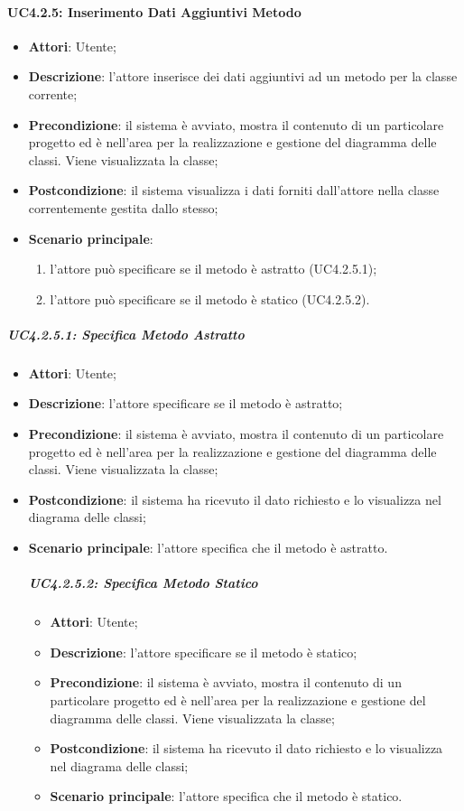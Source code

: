 \begin{itemize}
\begin{itemize}
\paragraph{UC4.2.5: Inserimento Dati Aggiuntivi Metodo}
\label{UC4.2.5}
\begin{itemize}
	\item \textbf{Attori}: Utente;
	\item \textbf{Descrizione}: l'attore inserisce dei dati aggiuntivi ad un metodo per la classe corrente;
	\item \textbf{Precondizione}:  il sistema è avviato, mostra il contenuto di un particolare progetto ed è nell'area per la realizzazione e gestione del diagramma delle classi. Viene visualizzata la classe;
	\item \textbf{Postcondizione}: il sistema visualizza i dati forniti dall'attore nella classe correntemente gestita dallo stesso;
	\item \textbf{Scenario principale}:
	\begin{enumerate}
		\item l'attore può specificare se il metodo è astratto (UC4.2.5.1);
		\item l'attore può specificare se il metodo è statico (UC4.2.5.2).
	\end{enumerate}
\end{itemize}

\subparagraph{UC4.2.5.1: Specifica Metodo Astratto}
\label{UC4.2.5.1}
\begin{itemize}
	\item \textbf{Attori}: Utente;
	\item \textbf{Descrizione}: l'attore specificare se il metodo è astratto;
	\item \textbf{Precondizione}: il sistema è avviato, mostra il contenuto di un particolare progetto ed è nell'area per la realizzazione e gestione del diagramma delle classi. Viene visualizzata la classe;
	\item \textbf{Postcondizione}: il sistema ha ricevuto il dato richiesto e lo visualizza nel diagrama delle classi;
	\item \textbf{Scenario principale}: l'attore specifica che il metodo è astratto.

\subparagraph{UC4.2.5.2: Specifica Metodo Statico}
\label{UC4.2.5.2}
\begin{itemize}
	\item \textbf{Attori}: Utente;
	\item \textbf{Descrizione}: l'attore specificare se il metodo è statico;
	\item \textbf{Precondizione}: il sistema è avviato, mostra il contenuto di un particolare progetto ed è nell'area per la realizzazione e gestione del diagramma delle classi. Viene visualizzata la classe;
	\item \textbf{Postcondizione}: il sistema ha ricevuto il dato richiesto e lo visualizza nel diagrama delle classi;
	\item \textbf{Scenario principale}: l'attore specifica che il metodo è statico.


\end{itemize}
\end{itemize}
\end{itemize}
\end{itemize}

